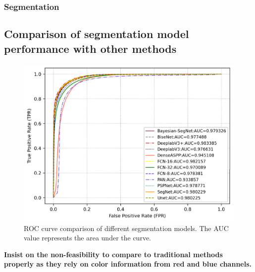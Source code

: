 \documentclass[amt, article]{copernicus}
\begin{document}
\subsubsection{Segmentation}

\subsection{Comparison of segmentation model performance with other methods}

\begin{figure}[t]
	\includegraphics[width=\hsize]{figures/roc_curve.png}
	\caption{ROC curve comparison of different segmentation models. The AUC value represents the area under the curve.}
    \label{fig:roc_curve}
\end{figure}

\textbf{Insist on the non-feasibility to compare to traditional methods properly as they rely on color information from red and blue channels.}
\end{document}
